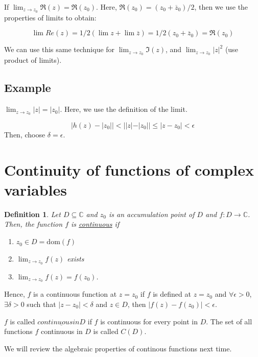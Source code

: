 \documentclass{article}
\newtheorem{definition}[theorem]{Definition}
\newtheorem{one minute paper}[theorem]{One Minute Paper}
\begin{document}
If $\lim_{z \rightarrow z_0}\Re(z) = \Re(z_0)$. Here, $\Re(z_0) = (z_0 + \overline{z}_0)/2$, then we use the properties of limits to obtain:

\begin{equation}
    \lim Re(z) = 1/2(\lim z + \lim \overline{z}) = 1/2(z_0 + \overline{z}_0) = \Re(z_0)
\end{equation}

We can use this same technique for $\lim_{z \rightarrow z_0} \Im(z)$, and $\lim_{z \rightarrow z_0} |z|^2$ (use product of limits). 

\subsection*{Example}

$\lim_{z \rightarrow z_0} |z| = |z_0|$. Here, we use the definition of the limit. 

\begin{equation}
    |h(z) - |z_0|| < ||z| - |z_0|| \leq |z - z_0| < \epsilon
\end{equation}
Then, choose $\delta = \epsilon$. 

\section*{Continuity of functions of complex variables}

\begin{definition}
    Let $D \subseteq \mathbb{C}$ and $z_0$ is an accumulation point of $D$ and $f: D \rightarrow \mathbb{C}$. Then, the function $f$ is \underline{continuous} if 
    \begin{enumerate}
        \item $z_0 \in D = \text{dom}(f)$
        \item $\lim_{z \rightarrow z_0} f(z)$ exists
        \item $\lim_{z \rightarrow z_0} f(z) = f(z_0)$. 
    \end{enumerate}
\end{definition}

Hence, $f$ is a continuous function at $z = z_0$ if $f$ is defined at $z = z_0$ and $\forall \epsilon > 0$, $\exists \delta > 0$ such that $|z - z_0| < \delta$ and $z \in D$, then $|f(z) - f(z_0)| < \epsilon$. 

$f$ is called $\underline{continuous in D}$ if $f$ is continuous for every point in $D$. The set of all functions $f$ continuous in $D$ is called $C(D)$. 

We will review the algebraic properties of continous functions next time. 
\end{document}
